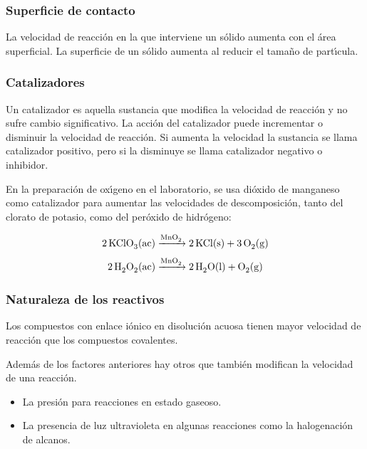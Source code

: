 \subsubsection{Superficie de contacto}
La velocidad de reacci\'on  en la que interviene un s\'olido aumenta con el \'area superficial. La superficie de un s\'olido aumenta al reducir el tama\~no de part\'{\i}cula.
\subsubsection{Catalizadores}
Un \gls{catalizador} es aquella sustancia que modifica la
velocidad de reacci\'on y no sufre cambio significativo. La acci\'on del catalizador puede incrementar o disminuir la velocidad de reacci\'on. Si aumenta la velocidad la sustancia se llama catalizador positivo, pero si la disminuye se llama catalizador negativo o inhibidor.
 
 
\begin{example}
En la preparaci\'on de ox\'{\i}geno en el laboratorio, se usa di\'oxido de manganeso como catalizador para aumentar las velocidades de descomposici\'on, tanto del clorato de potasio, como del per\'oxido de hidr\'ogeno:

$$ \ce{2KClO3 (ac) ->[\ce{MnO2}]  2KCl (s)  + 3O2 (g)} $$
$$\ce{2H2O2 (ac) ->[\ce{MnO2}]  2H2O (l) + O2 (g)} $$
\end{example}

\subsubsection{Naturaleza de los reactivos}

Los compuestos con enlace i\'onico en disoluci\'on acuosa tienen mayor velocidad de reacci\'on que los compuestos covalentes.

Adem\'as de los factores anteriores hay otros que tambi\'en modifican la velocidad de una reacci\'on.

\begin{itemize}
\item La presi\'on para reacciones en estado  gaseoso.
\item La presencia de luz ultravioleta en algunas reacciones como la halogenaci\'on de alcanos. 
\end{itemize}

